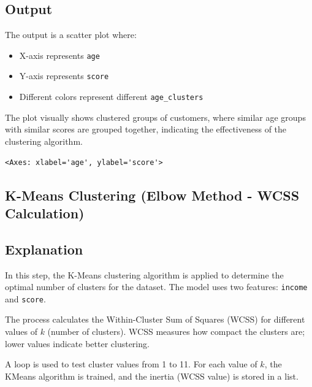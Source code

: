 \documentclass[11pt]{article}
\makeatletter
\newcommand{\boxspacing}{\kern\kvtcb@left@rule\kern\kvtcb@boxsep}
\newcommand{\prompt}[4]{
        {\ttfamily\llap{{\color{#2}[#3]:\hspace{3pt}#4}}\vspace{-\baselineskip}}
    }
\makeatother
\begin{document}
\subsection*{Output}
The output is a scatter plot where:
\begin{itemize}
    \item X-axis represents \texttt{age}
    \item Y-axis represents \texttt{score}
    \item Different colors represent different \texttt{age\_clusters}
\end{itemize}

The plot visually shows clustered groups of customers, where similar age groups with similar scores are grouped together, indicating the effectiveness of the clustering algorithm.
\begin{tcolorbox}[breakable, size=fbox, boxrule=.5pt, pad at break*=1mm, opacityfill=0]
\prompt{Out}{outcolor}{27}{\boxspacing}
\begin{Verbatim}[commandchars=\\\{\}]
<Axes: xlabel='age', ylabel='score'>
\end{Verbatim}
\end{tcolorbox}
        
    \begin{center}
    \end{center}
    
\subsection{K-Means Clustering (Elbow Method - WCSS Calculation)}

\subsection*{Explanation}
In this step, the K-Means clustering algorithm is applied to determine the optimal number of clusters for the dataset. The model uses two features: \texttt{income} and \texttt{score}.

The process calculates the Within-Cluster Sum of Squares (WCSS) for different values of \(k\) (number of clusters). WCSS measures how compact the clusters are; lower values indicate better clustering.

A loop is used to test cluster values from 1 to 11. For each value of \(k\), the KMeans algorithm is trained, and the inertia (WCSS value) is stored in a list.
\end{document}
